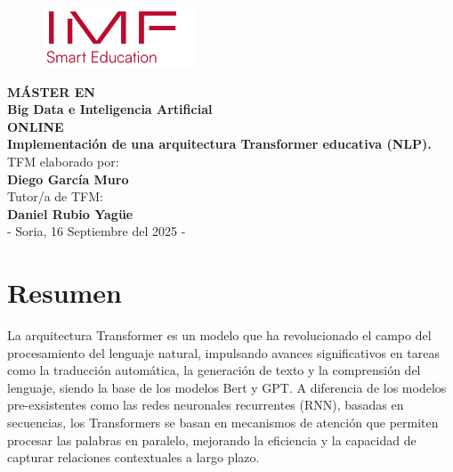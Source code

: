 \documentclass[11pt]{book}
\newcommand{\clearemptydoublepage}{\newpage{\pagestyle{empty}\cleardoublepage}}
\begin{document}
\frontmatter
\pagestyle{miestilo}




\begin{titlepage}
    \centering

    \begin{figure}
    \centering
    \includegraphics[width=0.25\linewidth]{img/logo_imf.png}
    \end{figure}

    \vspace*{1cm}
    {\Large \textbf{MÁSTER EN} \\[0.3cm]
    \textbf{Big Data e Inteligencia Artificial} \\[1cm]
    \textbf{ONLINE}}\\[3cm]
    
    {\LARGE \textcolor{miRojo}{\textbf{Implementación de una arquitectura Transformer educativa (NLP).}}} \\[2cm]
    
    {\large TFM elaborado por: \\[0.3cm]
    \textbf{Diego García Muro}} \\[1cm]
    
    {\large Tutor/a de TFM: \\[0.3cm]
    \textbf{Daniel Rubio Yagüe}} \\[4cm]
    
    {\large - Soria, 16 Septiembre del 2025 - }
    
    \vfill
\end{titlepage}

\clearemptydoublepage



\chapter{Resumen}

La arquitectura Transformer es un modelo que ha revolucionado el campo del procesamiento del lenguaje natural, impulsando avances significativos en tareas como la traducción automática, la generación de texto y la comprensión del lenguaje, siendo la base de los modelos Bert y GPT. A diferencia de los modelos pre-exsistentes como las redes neuronales recurrentes (RNN), basadas en secuencias, los Transformers se basan en mecanismos de atención que permiten procesar las palabras en paralelo, mejorando la eficiencia y la capacidad de capturar relaciones contextuales a largo plazo.
\end{document}
